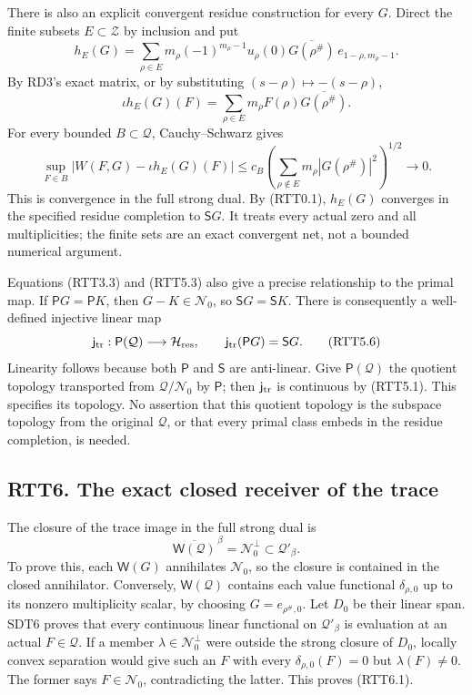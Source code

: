 There is also an explicit convergent residue construction for every
\(G\). Direct the finite subsets \(E\subset\mathscr Z\) by inclusion and
put \[
h_E(G)=\sum_{\rho\in E}
m_\rho(-1)^{m_\rho-1}u_\rho(0)
\overline{G(\rho^\#)}\,e_{1-\rho,m_\rho-1}.
\tag{RTT5.3}
\] By RD3's exact matrix, or by substituting
\((s-\rho)\mapsto-(s-\rho)\), \[
\iota h_E(G)(F)=\sum_{\rho\in E}
m_\rho F(\rho)\overline{G(\rho^\#)}.
\tag{RTT5.4}
\] For every bounded \(B\subset\mathcal Q\), Cauchy--Schwarz gives \[
\sup_{F\in B}|W(F,G)-\iota h_E(G)(F)|
\le c_B\left(\sum_{\rho\notin E}
m_\rho|G(\rho^\#)|^2\right)^{1/2}\longrightarrow0.
\tag{RTT5.5}
\] This is convergence in the full strong dual. By (RTT0.1), \(h_E(G)\)
converges in the specified residue completion to \(\mathsf S G\). It
treats every actual zero and all multiplicities; the finite sets are an
exact convergent net, not a bounded numerical argument.

Equations (RTT3.3) and (RTT5.3) also give a precise relationship to the
primal map. If \(\mathsf P G=\mathsf P K\), then \(G-K\in\mathcal N_0\),
so \(\mathsf S G=\mathsf S K\). There is consequently a well-defined
injective linear map \[
\mathsf j_{\rm tr}:\mathsf P(\mathcal Q)\longrightarrow\mathcal H_{\rm res},
\qquad \mathsf j_{\rm tr}(\mathsf P G)=\mathsf S G.
\tag{RTT5.6}
\] Linearity follows because both \(\mathsf P\) and \(\mathsf S\) are
anti-linear. Give \(\mathsf P(\mathcal Q)\) the quotient topology
transported from \(\mathcal Q/\mathcal N_0\) by \(\mathsf P\); then
\(\mathsf j_{\rm tr}\) is continuous by (RTT5.1). This specifies its
topology. No assertion that this quotient topology is the subspace
topology from the original \(\mathcal Q\), or that every primal class
embeds in the residue completion, is needed.

\subsection{RTT6. The exact closed receiver of the
trace}\label{rtt6.-the-exact-closed-receiver-of-the-trace}

The closure of the trace image in the full strong dual is \[
\overline{\mathsf W(\mathcal Q)}^{\,\beta}
=\mathcal N_0^\perp\subset\mathcal Q'_\beta.
\tag{RTT6.1}
\] To prove this, each \(\mathsf W(G)\) annihilates \(\mathcal N_0\), so
the closure is contained in the closed annihilator. Conversely,
\(\mathsf W(\mathcal Q)\) contains each value functional
\(\delta_{\rho,0}\) up to its nonzero multiplicity scalar, by choosing
\(G=e_{\rho^\#,0}\). Let \(D_0\) be their linear span. SDT6 proves that
every continuous linear functional on \(\mathcal Q'_\beta\) is
evaluation at an actual \(F\in\mathcal Q\). If a member
\(\lambda\in\mathcal N_0^\perp\) were outside the strong closure of
\(D_0\), locally convex separation would give such an \(F\) with every
\(\delta_{\rho,0}(F)=0\) but \(\lambda(F)\ne0\). The former says
\(F\in\mathcal N_0\), contradicting the latter. This proves (RTT6.1).

